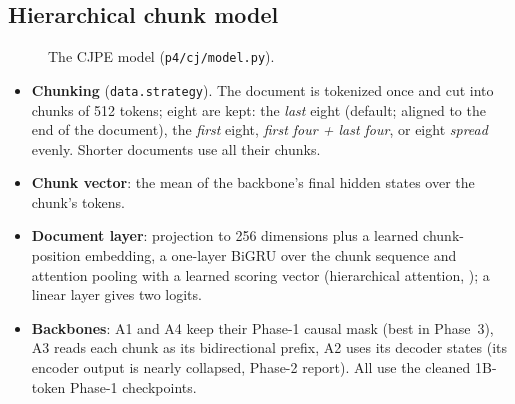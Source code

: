 \documentclass[11pt,a4paper]{article}
\newcommand{\code}[1]{\texttt{\small #1}}
\begin{document}
\subsection{Hierarchical chunk model}
\begin{figure}[H]\centering
{}
\caption{The CJPE model (\code{p4/cj/model.py}).}
\label{fig:model}\end{figure}

\begin{itemize}
  \item \textbf{Chunking} (\code{data.strategy}). The document is tokenized once and cut into chunks of 512
  tokens; eight are kept: the \emph{last} eight (default; aligned to the end of the document), the \emph{first}
  eight, \emph{first four + last four}, or eight \emph{spread} evenly.  Shorter documents use all their chunks.
  \item \textbf{Chunk vector}: the mean of the backbone's final hidden states over the chunk's tokens.
  \item \textbf{Document layer}: projection to 256 dimensions plus a learned chunk-position embedding, a
  one-layer BiGRU \cite{cho2014gru} over the chunk sequence and attention pooling with a learned scoring vector
  (hierarchical attention, \cite{yang2016han}); a linear layer gives two logits.
  \item \textbf{Backbones}: A1 and A4 keep their Phase-1 causal mask (best in Phase~3), A3 reads each chunk as its
  bidirectional prefix, A2 uses its decoder states (its encoder output is nearly collapsed, Phase-2 report).
  All use the cleaned 1B-token Phase-1 checkpoints.
\end{itemize}
\end{document}
